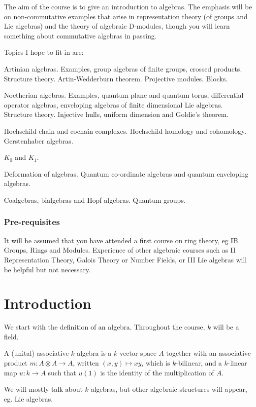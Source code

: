 \documentclass[a4paper]{article}
\begin{document}
\maketitle
{\small
\setlength{\parindent}{0em}
\setlength{\parskip}{1em}
The aim of the course is to give an introduction to algebras. The emphasis will be on non-commutative examples that arise in representation theory (of groups and Lie algebras) and the theory of algebraic D-modules, though you will learn something about commutative algebras in passing.

Topics I hope to fit in are:

Artinian algebras. Examples, group algebras of finite groups, crossed products. Structure theory. Artin-Wedderburn theorem. Projective modules. Blocks.

Noetherian algebras. Examples, quantum plane and quantum torus, differential operator algebras, enveloping algebras of finite dimensional Lie algebras. Structure theory. Injective hulls, uniform dimension and Goldie's theorem.

Hochschild chain and cochain complexes. Hochschild homology and cohomology. Gerstenhaber algebras.

$K_0$ and $K_1$.

Deformation of algebras. Quantum co-ordinate algebras and quantum enveloping algebras.

Coalgebras, bialgebras and Hopf algebras. Quantum groups.

\subsubsection*{Pre-requisites}
It will be assumed that you have attended a first course on ring theory, eg IB Groups, Rings and Modules. Experience of other algebraic courses such as II Representation Theory, Galois Theory or Number Fields, or III Lie algebras will be helpful but not necessary.
}
\tableofcontents

\setcounter{section}{-1}
\section{Introduction}
We start with the definition of an algebra. Throughout the course, $k$ will be a field.
\begin{defi}[$k$-algebra]
  A (unital) associative $k$-algebra is a $k$-vector space $A$ together with an associative product $m: A \otimes A \to A$, written $(x, y) \mapsto xy$, which is $k$-bilinear, and a $k$-linear map $u: k \to A$ such that $u(1)$ is the identity of the multiplication of $A$.
\end{defi}
We will mostly talk about $k$-algebras, but other algebraic structures will appear, eg. Lie algebras.
\end{document}
